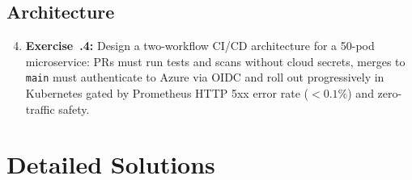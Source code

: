 \subsection{Architecture}
\begin{enumerate}[leftmargin=18pt]
  \setcounter{enumi}{3}
  \item \textbf{Exercise~\thechapter.4:} Design a two-workflow CI/CD architecture for a 50-pod microservice: PRs must run tests and scans without cloud secrets, merges to \texttt{main} must authenticate to Azure via OIDC and roll out progressively in Kubernetes gated by Prometheus HTTP 5xx error rate ($< 0.1\%$) and zero-traffic safety.
\end{enumerate}

\section{Detailed Solutions}
